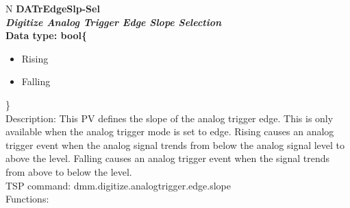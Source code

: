\documentclass[openany]{article}
\begin{document}
		\begin{tabular}{N}
			\hline
			\bfseries DATrEdgeSlp-Sel\label{pv:datredgeslp-sel} \\ \hline
			\emph{Digitize Analog Trigger Edge Slope Selection} \\
			Data type: bool\{\begin{itemize}[noitemsep]
				\small
				\item[] Rising
				\item[] Falling
			\end{itemize}\} \\
			Description: This PV defines the slope of the analog trigger edge. This is only available when the analog trigger mode is set to edge. Rising causes an analog trigger event when the analog signal trends from below the analog signal level to above the level. Falling causes an analog trigger event when the signal trends from above to below the level. \\
			TSP command: dmm.digitize.analogtrigger.edge.slope \\
			Functions: \\
			\arrayrulecolor{\FuncTableBorderColor}

		\end{tabular}
\end{document}
